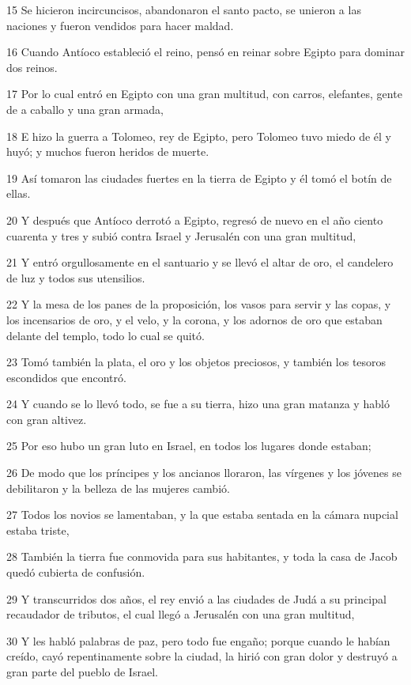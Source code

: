 \par 15 Se hicieron incircuncisos, abandonaron el santo pacto, se unieron a las naciones y fueron vendidos para hacer maldad.
\par 16 Cuando Antíoco estableció el reino, pensó en reinar sobre Egipto para dominar dos reinos.
\par 17 Por lo cual entró en Egipto con una gran multitud, con carros, elefantes, gente de a caballo y una gran armada,
\par 18 E hizo la guerra a Tolomeo, rey de Egipto, pero Tolomeo tuvo miedo de él y huyó; y muchos fueron heridos de muerte.
\par 19 Así tomaron las ciudades fuertes en la tierra de Egipto y él tomó el botín de ellas.
\par 20 Y después que Antíoco derrotó a Egipto, regresó de nuevo en el año ciento cuarenta y tres y subió contra Israel y Jerusalén con una gran multitud,
\par 21 Y entró orgullosamente en el santuario y se llevó el altar de oro, el candelero de luz y todos sus utensilios.
\par 22 Y la mesa de los panes de la proposición, los vasos para servir y las copas, y los incensarios de oro, y el velo, y la corona, y los adornos de oro que estaban delante del templo, todo lo cual se quitó.
\par 23 Tomó también la plata, el oro y los objetos preciosos, y también los tesoros escondidos que encontró.
\par 24 Y cuando se lo llevó todo, se fue a su tierra, hizo una gran matanza y habló con gran altivez.
\par 25 Por eso hubo un gran luto en Israel, en todos los lugares donde estaban;
\par 26 De modo que los príncipes y los ancianos lloraron, las vírgenes y los jóvenes se debilitaron y la belleza de las mujeres cambió.
\par 27 Todos los novios se lamentaban, y la que estaba sentada en la cámara nupcial estaba triste,
\par 28 También la tierra fue conmovida para sus habitantes, y toda la casa de Jacob quedó cubierta de confusión.
\par 29 Y transcurridos dos años, el rey envió a las ciudades de Judá a su principal recaudador de tributos, el cual llegó a Jerusalén con una gran multitud,
\par 30 Y les habló palabras de paz, pero todo fue engaño; porque cuando le habían creído, cayó repentinamente sobre la ciudad, la hirió con gran dolor y destruyó a gran parte del pueblo de Israel.
